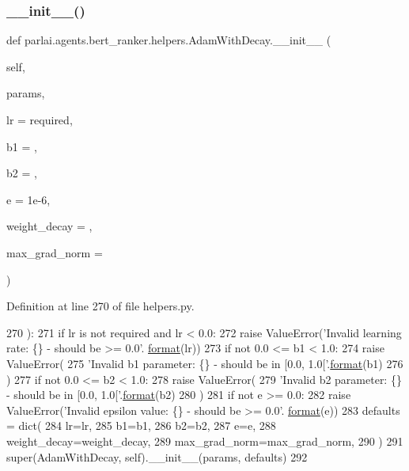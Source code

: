 \subsubsection{\texorpdfstring{\+\_\+\+\_\+init\+\_\+\+\_\+()}{\_\_init\_\_()}}
{\footnotesize\ttfamily def parlai.\+agents.\+bert\+\_\+ranker.\+helpers.\+Adam\+With\+Decay.\+\_\+\+\_\+init\+\_\+\+\_\+ (\begin{DoxyParamCaption}\item[{}]{self,  }\item[{}]{params,  }\item[{}]{lr = {\ttfamily required},  }\item[{}]{b1 = {},  }\item[{}]{b2 = {},  }\item[{}]{e = {\ttfamily 1e-\/6},  }\item[{}]{weight\+\_\+decay = {},  }\item[{}]{max\+\_\+grad\+\_\+norm = {} }\end{DoxyParamCaption})}



Definition at line 270 of file helpers.\+py.


\begin{DoxyCode}
270     ):
271         \textcolor{keywordflow}{if} lr \textcolor{keywordflow}{is} \textcolor{keywordflow}{not} required \textcolor{keywordflow}{and} lr < 0.0:
272             \textcolor{keywordflow}{raise} ValueError(\textcolor{stringliteral}{'Invalid learning rate: \{\} - should be >= 0.0'}.
      \hyperlink{namespaceparlai_1_1chat__service_1_1services_1_1messenger_1_1shared__utils_a32e2e2022b824fbaf80c747160b52a76}{format}(lr))
273         \textcolor{keywordflow}{if} \textcolor{keywordflow}{not} 0.0 <= b1 < 1.0:
274             \textcolor{keywordflow}{raise} ValueError(
275                 \textcolor{stringliteral}{'Invalid b1 parameter: \{\} - should be in [0.0, 1.0['}.\hyperlink{namespaceparlai_1_1chat__service_1_1services_1_1messenger_1_1shared__utils_a32e2e2022b824fbaf80c747160b52a76}{format}(b1)
276             )
277         \textcolor{keywordflow}{if} \textcolor{keywordflow}{not} 0.0 <= b2 < 1.0:
278             \textcolor{keywordflow}{raise} ValueError(
279                 \textcolor{stringliteral}{'Invalid b2 parameter: \{\} - should be in [0.0, 1.0['}.\hyperlink{namespaceparlai_1_1chat__service_1_1services_1_1messenger_1_1shared__utils_a32e2e2022b824fbaf80c747160b52a76}{format}(b2)
280             )
281         \textcolor{keywordflow}{if} \textcolor{keywordflow}{not} e >= 0.0:
282             \textcolor{keywordflow}{raise} ValueError(\textcolor{stringliteral}{'Invalid epsilon value: \{\} - should be >= 0.0'}.
      \hyperlink{namespaceparlai_1_1chat__service_1_1services_1_1messenger_1_1shared__utils_a32e2e2022b824fbaf80c747160b52a76}{format}(e))
283         defaults = dict(
284             lr=lr,
285             b1=b1,
286             b2=b2,
287             e=e,
288             weight\_decay=weight\_decay,
289             max\_grad\_norm=max\_grad\_norm,
290         )
291         super(AdamWithDecay, self).\_\_init\_\_(params, defaults)
292 
\end{DoxyCode}


